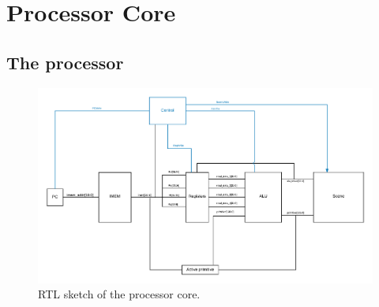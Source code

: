 \chapter{Processor Core}

\section{The \vthreek processor}

\begin{figure}[h!]
    \includegraphics[width=\linewidth]{images/processor-core.png}
    \caption{RTL sketch of the \vthreek processor core.}
    \label{fig:processor-core}
\end{figure}

